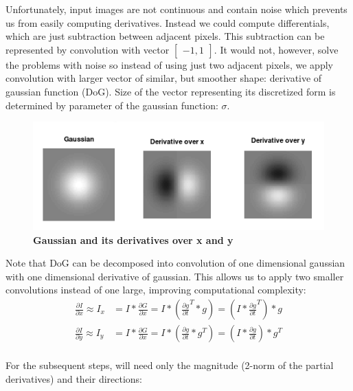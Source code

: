 \documentclass[fleqn,moreauthors,10pt]{ds_report}
\begin{document}
Unfortunately, input images are not continuous and contain noise which prevents us from easily computing derivatives. Instead we could compute differentials, which are just subtraction between adjacent pixels. This subtraction can be represented by convolution with vector $\begin{bmatrix}-1, 1\end{bmatrix}$. It would not, however, solve the problems with noise so instead of using just two adjacent pixels, we apply convolution with larger vector of similar, but smoother shape: derivative of gaussian function (DoG). Size of the vector representing its discretized form is determined by parameter of the gaussian function: $\sigma$.

\begin{figure}[h]\centering
	\includegraphics[width=\linewidth]{gaussians.png}
	\caption{\textbf{Gaussian and its derivatives over x and y}}
	\label{fig:gaussians}
\end{figure}

Note that DoG can be decomposed into convolution of one dimensional gaussian with one dimensional derivative of gaussian. This allows us to apply two smaller convolutions instead of one large, improving computational complexity:
\begin{equation}
	\begin{aligned}
		\frac{\partial I}{\partial x} \approx I_x 
		& = I \ast \frac{\partial G}{\partial x} 
		= I \ast (\frac{\partial g}{\partial t}^T \ast g)
		= (I \ast \frac{\partial g}{\partial t}^T) \ast g\\
		\frac{\partial I}{\partial y} \approx I_y 
		& = I \ast \frac{\partial G}{\partial x} 
		= I \ast (\frac{\partial g}{\partial t} \ast g^T)
		= (I \ast \frac{\partial g}{\partial t}) \ast g^T\\
	\end{aligned}
\end{equation}

For the subsequent steps, will need only the magnitude (2-norm of the partial derivatives) and their directions: 
\end{document}
